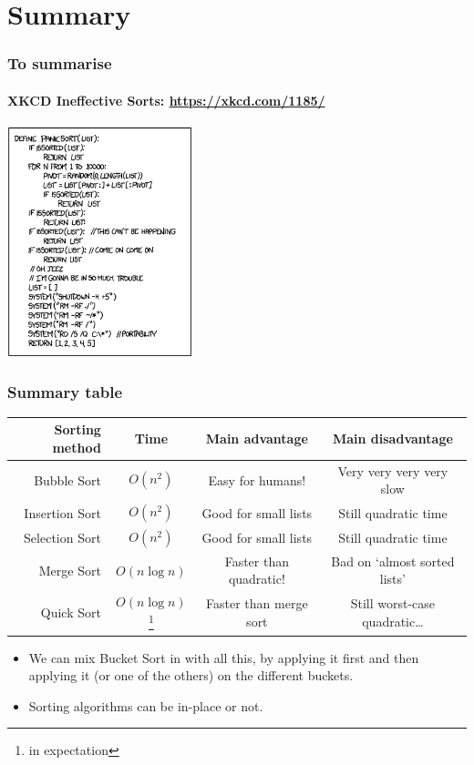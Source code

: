 \section{Summary}
\label{sec:summary}

\begin{frame}
	\frametitle{To summarise}
	\framesubtitle{XKCD Ineffective Sorts: \url{https://xkcd.com/1185/}}
	\begin{center}
		\includegraphics[width=0.4\textwidth]{figures/panicsort.png}\\
	\end{center}
\end{frame}
	
\begin{frame}
	\frametitle{Summary table}
	\begin{tabular}{r | c | c | c}
		\small
		Sorting method & Time & Main advantage & Main disadvantage \\
		\midrule
		Bubble Sort & $O(n^2)$ & Easy for humans! &  Very very very very slow \\
		Insertion Sort & $O(n^2)$ & Good for small lists &  Still quadratic time \\
		Selection Sort & $O(n^2)$ & Good for small lists &  Still quadratic time \\
		Merge Sort & $O(n \log n)$ & Faster than quadratic! &  Bad on `almost sorted lists' \\
		Quick Sort & $O(n \log n)$\footnote{in expectation} & Faster than merge sort &  Still worst-case quadratic\dots \\
	\end{tabular}
	\begin{itemize}
		\item We can mix Bucket Sort in with all this, by applying it first and then applying it (or one of the others) on
			the different buckets.
		\item Sorting algorithms can be in-place or not.
	\end{itemize}
\end{frame}


